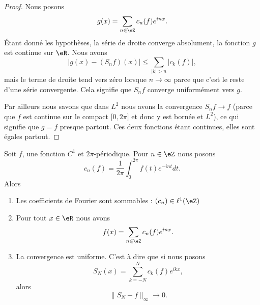 \begin{proof}
    Nous posons
    \begin{equation}
        g(x)=\sum_{n\in \eZ}c_n(f) e^{inx}.
    \end{equation}
    Étant donné les hypothèses, la série de droite converge absolument, la fonction \( g\) est continue sur \( \eR\). Nous avons
    \begin{equation}
        \big| g(x)-(S_nf)(x) \big|\leq \sum_{| k |> n}| c_k(f) |,
    \end{equation}
    mais le terme de droite tend vers zéro lorsque \( n\to \infty\) parce que c'est le reste d'une série convergente. Cela signifie que \( S_nf\) converge uniformément vers \( g\).

    Par ailleurs nous savons que dans \( L^2\) nous avons la convergence \( S_nf\to f\) (parce que \( f\) est continue sur le compact \( \mathopen[ 0 , 2\pi \mathclose]\) et donc y est bornée et \( L^2\)), ce qui signifie que \( g=f\) presque partout. Ces deux fonctions étant continues, elles sont égales partout.
\end{proof}

\begin{theorem}     \label{ThozHXraQ}
    Soit \( f\), une fonction \( C^1\) et \( 2\pi\)-périodique. Pour \( n\in \eZ\) nous posons
    \begin{equation}
        c_n(f)=\frac{1}{ 2\pi }\int_0^{2\pi}f(t) e^{-int}dt.
    \end{equation}
    Alors
    \begin{enumerate}
        \item
            Les coefficients de Fourier sont sommables : \( (c_n)\in \ell^1(\eZ)\) 
        \item
            Pour tout \( x\in \eR\) nous avons
            \begin{equation}
                f(x)=\sum_{n\in \eZ}c_n(f) e^{inx}.
            \end{equation}
        \item
            La convergence est uniforme. C'est à dire que si nous posons
            \begin{equation}
                S_N(x)=\sum_{k=-N}^Nc_k(f) e^{ikx},
            \end{equation}
            alors
            \begin{equation}
                \| S_N-f \|_{\infty}\to 0.
            \end{equation}
    \end{enumerate}
\end{theorem}

